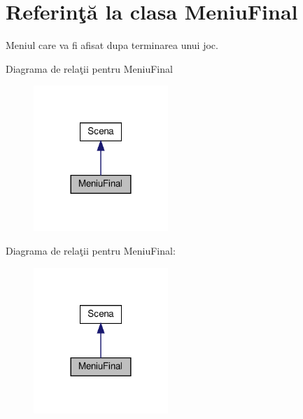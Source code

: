 \hypertarget{classMeniuFinal}{}\section{Referinţă la clasa Meniu\+Final}
\label{classMeniuFinal}


Meniul care va fi afisat dupa terminarea unui joc.  




Diagrama de relaţii pentru Meniu\+Final
\nopagebreak
\begin{figure}[H]
\begin{center}
\leavevmode
\includegraphics[width=144pt]{classMeniuFinal__inherit__graph}
\end{center}
\end{figure}


Diagrama de relaţii pentru Meniu\+Final\+:
\nopagebreak
\begin{figure}[H]
\begin{center}
\leavevmode
\includegraphics[width=144pt]{classMeniuFinal__coll__graph}
\end{center}
\end{figure}
